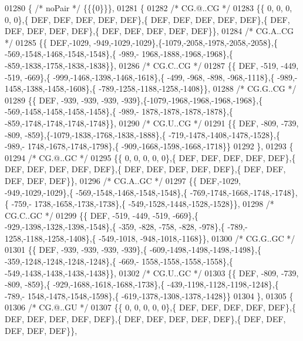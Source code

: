 \begin{DoxyCode}
01280 \{ \textcolor{comment}{/* noPair */} \{\{\{0\}\}\},
01281 \{
01282 \textcolor{comment}{/* CG.@..CG */}
01283 \{\{    0,    0,    0,    0,    0\},\{  DEF,  DEF,  DEF,  DEF,  DEF\},\{  DEF,  DEF,  DEF,  DEF,  DEF\},\{  DEF,  
      DEF,  DEF,  DEF,  DEF\},\{  DEF,  DEF,  DEF,  DEF,  DEF\}\},
01284 \textcolor{comment}{/* CG.A..CG */}
01285 \{\{  DEF,-1029, -949,-1029,-1029\},\{-1079,-2058,-1978,-2058,-2058\},\{ -569,-1548,-1468,-1548,-1548\},\{ -989,-
      1968,-1888,-1968,-1968\},\{ -859,-1838,-1758,-1838,-1838\}\},
01286 \textcolor{comment}{/* CG.C..CG */}
01287 \{\{  DEF, -519, -449, -519, -669\},\{ -999,-1468,-1398,-1468,-1618\},\{ -499, -968, -898, -968,-1118\},\{ -989,-
      1458,-1388,-1458,-1608\},\{ -789,-1258,-1188,-1258,-1408\}\},
01288 \textcolor{comment}{/* CG.G..CG */}
01289 \{\{  DEF, -939, -939, -939, -939\},\{-1079,-1968,-1968,-1968,-1968\},\{ -569,-1458,-1458,-1458,-1458\},\{ -989,-
      1878,-1878,-1878,-1878\},\{ -859,-1748,-1748,-1748,-1748\}\},
01290 \textcolor{comment}{/* CG.U..CG */}
01291 \{\{  DEF, -809, -739, -809, -859\},\{-1079,-1838,-1768,-1838,-1888\},\{ -719,-1478,-1408,-1478,-1528\},\{ -989,-
      1748,-1678,-1748,-1798\},\{ -909,-1668,-1598,-1668,-1718\}\}
01292 \},
01293 \{
01294 \textcolor{comment}{/* CG.@..GC */}
01295 \{\{    0,    0,    0,    0,    0\},\{  DEF,  DEF,  DEF,  DEF,  DEF\},\{  DEF,  DEF,  DEF,  DEF,  DEF\},\{  DEF,  
      DEF,  DEF,  DEF,  DEF\},\{  DEF,  DEF,  DEF,  DEF,  DEF\}\},
01296 \textcolor{comment}{/* CG.A..GC */}
01297 \{\{  DEF,-1029, -949,-1029,-1029\},\{ -569,-1548,-1468,-1548,-1548\},\{ -769,-1748,-1668,-1748,-1748\},\{ -759,-
      1738,-1658,-1738,-1738\},\{ -549,-1528,-1448,-1528,-1528\}\},
01298 \textcolor{comment}{/* CG.C..GC */}
01299 \{\{  DEF, -519, -449, -519, -669\},\{ -929,-1398,-1328,-1398,-1548\},\{ -359, -828, -758, -828, -978\},\{ -789,-
      1258,-1188,-1258,-1408\},\{ -549,-1018, -948,-1018,-1168\}\},
01300 \textcolor{comment}{/* CG.G..GC */}
01301 \{\{  DEF, -939, -939, -939, -939\},\{ -609,-1498,-1498,-1498,-1498\},\{ -359,-1248,-1248,-1248,-1248\},\{ -669,-
      1558,-1558,-1558,-1558\},\{ -549,-1438,-1438,-1438,-1438\}\},
01302 \textcolor{comment}{/* CG.U..GC */}
01303 \{\{  DEF, -809, -739, -809, -859\},\{ -929,-1688,-1618,-1688,-1738\},\{ -439,-1198,-1128,-1198,-1248\},\{ -789,-
      1548,-1478,-1548,-1598\},\{ -619,-1378,-1308,-1378,-1428\}\}
01304 \},
01305 \{
01306 \textcolor{comment}{/* CG.@..GU */}
01307 \{\{    0,    0,    0,    0,    0\},\{  DEF,  DEF,  DEF,  DEF,  DEF\},\{  DEF,  DEF,  DEF,  DEF,  DEF\},\{  DEF,  
      DEF,  DEF,  DEF,  DEF\},\{  DEF,  DEF,  DEF,  DEF,  DEF\}\},

\end{DoxyCode}
